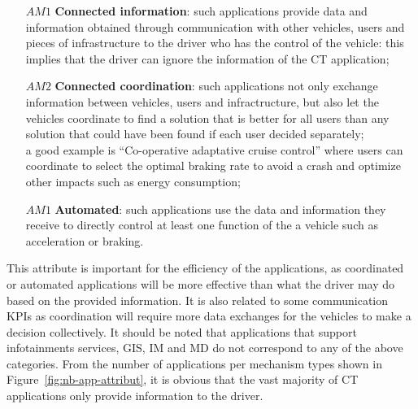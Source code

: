 \begin{enumerate}
\item[$AM1$] {\bf Connected information}: such applications provide data and information obtained through communication with other vehicles, users and pieces of infrastructure to the driver who has the control of the vehicle: this implies that the driver can ignore the information of the \acrshort{CT} application;
\item[$AM2$] {\bf Connected coordination}: such applications not only exchange information between vehicles, users and infractructure, but also let the vehicles coordinate to find a solution that is better for all users than any solution that could have been found if each user decided separately;\\
  a good example is ``Co-operative adaptative cruise control'' where users can coordinate to select the optimal braking rate to avoid a crash and optimize other impacts such as energy consumption;
\item[$AM1$] {\bf Automated}: such applications use the data and information they receive to directly control at least one function of the a vehicle such as acceleration or braking. 
\end{enumerate}

This attribute is important for the efficiency of the applications, as coordinated or automated applications will be more effective than what the driver may do based on the provided information. It is also related to some communication \acrshort{KPI}s as coordination will require more data exchanges for the vehicles to make a decision collectively. It should be noted that applications that support infotainments services, \acrfull{GIS}, \acrfull{IM} and \acrfull{MD} do not correspond to any of the above categories. From the number of applications per mechanism types shown in Figure~\ref{fig:nb-app-attribut}, it is obvious that the vast majority of \acrshort{CT} applications only provide information to the driver. 

